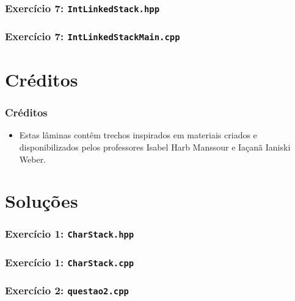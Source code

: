 \documentclass[aspectratio=169]{beamer}
\begin{document}
\begin{frame}[fragile]\frametitle{Exercício 7: \texttt{IntLinkedStack.hpp}}

\end{frame}

\begin{frame}[fragile]\frametitle{Exercício 7: \texttt{IntLinkedStackMain.cpp}}
\fontsize{6pt}{6pt}\selectfont{

}
\end{frame}

\section{Créditos}

\begin{frame}\frametitle{Créditos}
\begin{itemize}
	\item Estas lâminas contêm trechos inspirados em materiais criados e disponibilizados pelos professores Isabel Harb Manssour e Iaçanã Ianiski Weber.
\end{itemize}
\end{frame}

\section{Soluções}

\begin{frame}[fragile]\frametitle{Exercício 1: \texttt{CharStack.hpp}}

\end{frame}

\begin{frame}[fragile]\frametitle{Exercício 1: \texttt{CharStack.cpp}}
\fontsize{5pt}{5pt}\selectfont{

}
\end{frame}

\begin{frame}[fragile]\frametitle{Exercício 2: \texttt{questao2.cpp}}

\end{frame}
\end{document}
